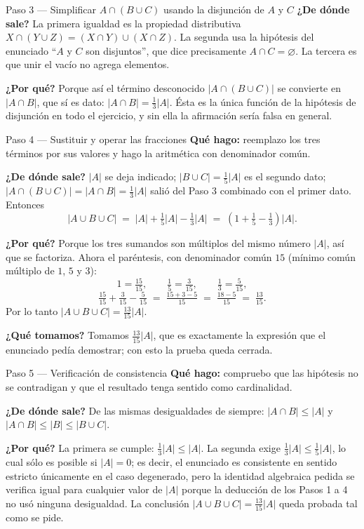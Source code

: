 \documentclass[11pt]{article}
\begin{document}
\begin{sol}
\begin{paso}{Paso 3 --- Simplificar $A\cap(B\cup C)$ usando la disjunción de $A$ y $C$}
\textbf{¿De dónde sale?} La primera igualdad es la propiedad distributiva $X\cap(Y\cup Z) = (X\cap Y)\cup(X\cap Z)$. La segunda usa la hipótesis del enunciado ``$A$ y $C$ son disjuntos'', que dice precisamente $A\cap C=\varnothing$. La tercera es que unir el vacío no agrega elementos.

\textbf{¿Por qué?} Porque así el término desconocido $|A\cap(B\cup C)|$ se convierte en $|A\cap B|$, que sí es dato: $|A\cap B| = \tfrac{1}{3}|A|$. Ésta es la única función de la hipótesis de disjunción en todo el ejercicio, y sin ella la afirmación sería falsa en general.
\end{paso}

\begin{paso}{Paso 4 --- Sustituir y operar las fracciones}
\textbf{Qué hago:} reemplazo los tres términos por sus valores y hago la aritmética con denominador común.

\textbf{¿De dónde sale?} $|A|$ se deja indicado; $|B\cup C| = \tfrac{1}{5}|A|$ es el segundo dato; $|A\cap(B\cup C)| = |A\cap B| = \tfrac{1}{3}|A|$ salió del Paso 3 combinado con el primer dato. Entonces
\[
|A\cup B\cup C| \;=\; |A| + \tfrac{1}{5}|A| - \tfrac{1}{3}|A|
\;=\; \left(1 + \tfrac{1}{5} - \tfrac{1}{3}\right)|A|.
\]

\textbf{¿Por qué?} Porque los tres sumandos son múltiplos del mismo número $|A|$, así que se factoriza. Ahora el paréntesis, con denominador común $15$ (mínimo común múltiplo de $1$, $5$ y $3$):
\[
1 = \tfrac{15}{15}, \qquad \tfrac{1}{5} = \tfrac{3}{15}, \qquad \tfrac{1}{3} = \tfrac{5}{15},
\]
\[
\tfrac{15}{15} + \tfrac{3}{15} - \tfrac{5}{15} \;=\; \tfrac{15+3-5}{15} \;=\; \tfrac{18-5}{15} \;=\; \tfrac{13}{15}.
\]
Por lo tanto $|A\cup B\cup C| = \tfrac{13}{15}|A|$.

\textbf{¿Qué tomamos?} Tomamos $\tfrac{13}{15}|A|$, que es exactamente la expresión que el enunciado pedía demostrar; con esto la prueba queda cerrada.
\end{paso}

\begin{paso}{Paso 5 --- Verificación de consistencia}
\textbf{Qué hago:} compruebo que las hipótesis no se contradigan y que el resultado tenga sentido como cardinalidad.

\textbf{¿De dónde sale?} De las mismas desigualdades de siempre: $|A\cap B|\le |A|$ y $|A\cap B|\le|B|\le |B\cup C|$.

\textbf{¿Por qué?} La primera se cumple: $\tfrac{1}{3}|A| \le |A|$. La segunda exige $\tfrac{1}{3}|A| \le \tfrac{1}{5}|A|$, lo cual sólo es posible si $|A|=0$; es decir, el enunciado es consistente en sentido estricto únicamente en el caso degenerado, pero la identidad algebraica pedida se verifica igual para cualquier valor de $|A|$ porque la deducción de los Pasos 1 a 4 no usó ninguna desigualdad. La conclusión $|A\cup B\cup C| = \tfrac{13}{15}|A|$ queda probada tal como se pide.
\end{paso}

\end{sol}
\end{document}
